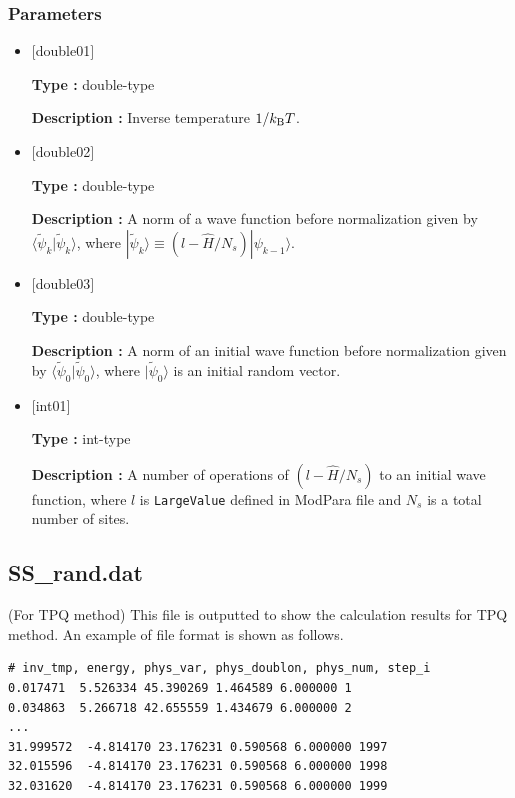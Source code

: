 \subsubsection{Parameters}
 \begin{itemize}

  \item  $[$double01$]$
  
 {\bf Type :} double-type

{\bf Description :}  Inverse temperature $1/{k_{\rm B}T}$.
 
  \item $[$double02$]$

 {\bf Type :} double-type 

{\bf Description :}  A norm of a wave function before normalization 
given by $\langle \tilde{\psi}_{k} |\tilde{\psi}_{k}\rangle$, where $|\tilde{\psi}_{k}\rangle \equiv(l-\hat{H}/N_{s})|\psi_{k-1}\rangle$.


  \item $[$double03$]$

 {\bf Type :} double-type 

{\bf Description :} A norm of an initial wave function before normalization 
given by $\langle \tilde{\psi}_{0} |\tilde{\psi}_{0}\rangle$, where $|\tilde{\psi}_{0}\rangle$ is an initial random vector.

  \item $[$int01$]$

 {\bf Type :} int-type 

{\bf Description :} A number of operations of $(l-\hat{H}/N_{s})$ to an initial wave function, where $l$ is \verb|LargeValue| defined in ModPara file and $N_{s}$ is a total number of sites.

 \end{itemize}


\newpage
\subsection{SS\_rand.dat}
\label{Subsec:ssrand}
(For TPQ method) This file is outputted to show the calculation results for TPQ method.
An example of file format is shown as follows.\\
\begin{minipage}{15cm}
\begin{screen}
\begin{verbatim}
# inv_tmp, energy, phys_var, phys_doublon, phys_num, step_i
0.017471  5.526334 45.390269 1.464589 6.000000 1
0.034863  5.266718 42.655559 1.434679 6.000000 2
...
31.999572  -4.814170 23.176231 0.590568 6.000000 1997
32.015596  -4.814170 23.176231 0.590568 6.000000 1998
32.031620  -4.814170 23.176231 0.590568 6.000000 1999
\end{verbatim}
\end{screen}
\end{minipage}


